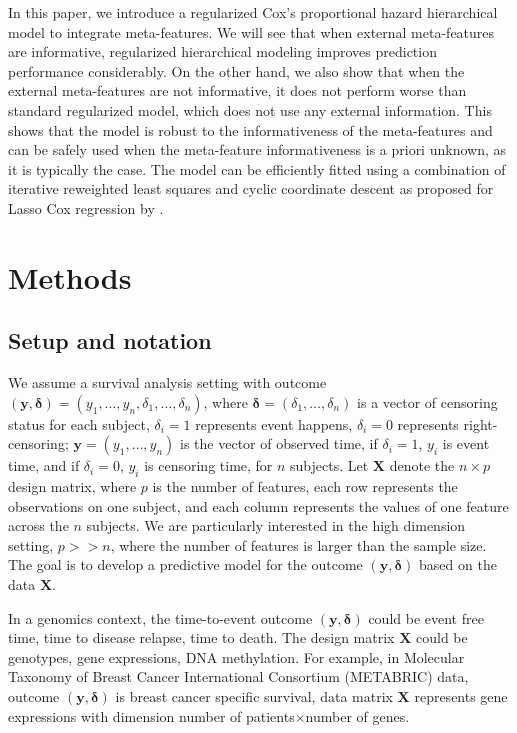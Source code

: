 In this paper, we introduce a regularized Cox’s proportional hazard hierarchical model to integrate meta-features. We will see that when external meta-features are informative, regularized hierarchical modeling improves prediction performance considerably. On the other hand, we also show that when the external meta-features are not informative, it does not perform worse than standard regularized model, which does not use any external information. This shows that the model is robust to the informativeness of the meta-features and can be safely used when the meta-feature informativeness is a priori unknown, as it is typically the case. The model can be efficiently fitted using a combination of iterative reweighted least squares and cyclic coordinate descent as proposed for Lasso Cox regression by \cite{simon2011regularization}.

\section{Methods}
\subsection{Setup and notation}
We assume a survival analysis setting with outcome $(\bm{y},\bm{\delta})=(y_1,\dots,y_n,\delta_1,\dots,\delta_n)$, where $\bm{\delta}=(\delta_1,\dots,\delta_n)$ is a vector of censoring status for each subject, $\delta_i=1$ represents event happens, $\delta_i=0$ represents right-censoring; $\bm{y}=(y_1,\dots,y_n)$ is the vector of observed time, if $\delta_i=1$, $y_i$ is event time, and if $\delta_i=0$, $y_i$ is censoring time, for $n$ subjects. Let $\bm{X}$ denote the $n\times p$ design matrix, where $p$ is the number of features, each row represents the observations on one subject, and each column represents the values of one feature across the $n$ subjects. We are particularly interested in the high dimension setting, $p>>n$, where the number of features is larger than the sample size. The goal is to develop a predictive model for the outcome $(\bm{y},\bm{\delta})$ based on the data $\bm{X}$.

In a genomics context, the time-to-event outcome $(\bm{y},\bm{\delta})$ could be event free time, time to disease relapse, time to death. The design matrix $\bm{X}$ could be genotypes, gene expressions, DNA methylation. For example, in Molecular Taxonomy of Breast Cancer International Consortium (METABRIC) data, outcome $(\bm{y},\bm{\delta})$ is breast cancer specific survival, data matrix $\bm{X}$ represents gene expressions with dimension number of patients$\times$number of genes.

